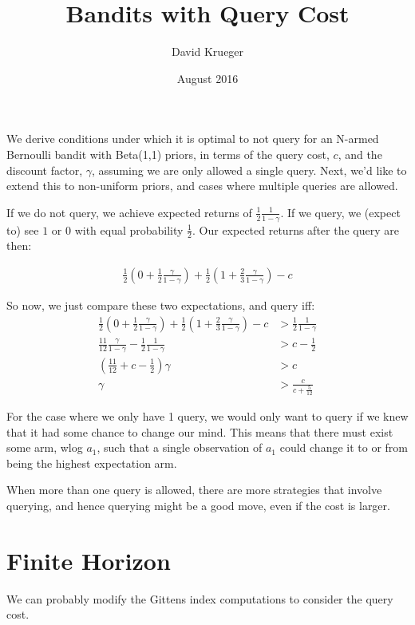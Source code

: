 \documentclass{article}
\title{Bandits with Query Cost}
\author{David Krueger}
\date{August 2016}
\begin{document}
\maketitle


We derive conditions under which it is optimal to not query for an N-armed Bernoulli bandit with Beta(1,1) priors, in terms of the query cost, $c$, and the discount factor, $\gamma$, assuming we are only allowed a single query.
Next, we'd like to extend this to non-uniform priors, and cases where multiple queries are allowed.

If we do not query, we achieve expected returns of $\frac{1}{2}\frac{1}{1-\gamma}$.
If we query, we (expect to) see $1$ or $0$ with equal probability $\frac{1}{2}$.
Our expected returns after the query are then:

\begin{align}
\frac{1}{2} (0 + \frac{1}{2}\frac{\gamma}{1-\gamma}) + \frac{1}{2}(1 + \frac{2}{3}\frac{\gamma}{1-\gamma}) - c
\end{align}

So now, we just compare these two expectations, and query iff:
\begin{align}
\frac{1}{2}(0 + \frac{1}{2}\frac{\gamma}{1-\gamma}) + \frac{1}{2}(1 + \frac{2}{3}\frac{\gamma}{1-\gamma}) - c &> \frac{1}{2}\frac{1}{1-\gamma} \\
\frac{11}{12}\frac{\gamma}{1-\gamma} - \frac{1}{2}\frac{1}{1-\gamma} &> c - \frac{1}{2} \\
(\frac{11}{12} + c - \frac{1}{2}) \gamma &> c \\
\gamma &> \frac{c}{c + \frac{5}{12}}
\end{align}


For the case where we only have 1 query, we would only want to query if we knew that it had some chance to change our mind.
This means that there must exist some arm, wlog $a_1$, such that a single observation of $a_1$ could change it to or from being the highest expectation arm.


When more than one query is allowed, there are more strategies that involve querying, and hence querying might be a good move, even if the cost is larger.


\section{Finite Horizon}

We can probably modify the Gittens index computations to consider the query cost.
\end{document}
